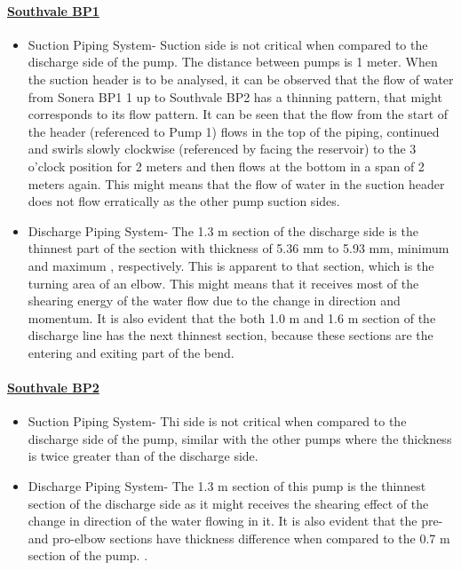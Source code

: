 \paragraph{\underline{Southvale BP1}}
\begin{itemize}
\item Suction Piping System- Suction side is not critical when compared to the discharge side of the pump. The distance between pumps is 1 meter. When the suction header is to be analysed, it can be observed that the flow of water from Sonera BP1 1 up to Southvale BP2 has a thinning pattern, that might corresponds to its flow pattern. It can be seen that the flow from the start of the header (referenced to Pump 1) flows in the top of the piping, continued and swirls slowly clockwise (referenced by facing the reservoir) to the 3 o'clock position for 2 meters and then flows at the bottom in a span of 2 meters again. This might means that the flow of water in the suction header does not flow erratically as the other pump suction sides.

\item Discharge Piping System- The 1.3 m section of the discharge side is the thinnest part of the section with thickness of 5.36 mm to 5.93 mm, minimum and maximum , respectively. This is apparent to that section, which is the turning area of an elbow. This might means that it receives most of the shearing energy of the water flow due to the change in direction and momentum. It is also evident that the both 1.0 m and  1.6 m section of the discharge line has the next thinnest section, because these sections are the entering and exiting part of the bend.

\end{itemize}

\paragraph{\underline{Southvale BP2}}
\begin{itemize}
\item Suction Piping System- Thi side is not critical when compared to the discharge side of the pump, similar with the other pumps where the thickness is twice greater than of the discharge side. 

\item Discharge Piping System- The 1.3 m section of this pump is the thinnest section of the discharge side as it might receives the shearing effect of the change in direction of the water flowing in it. It is also evident that the pre- and pro-elbow sections have thickness difference when compared to the 0.7 m section of the pump. 
.
\end{itemize}


